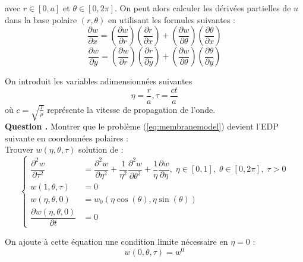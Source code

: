\documentclass[a4,12pt]{article}
\newcounter{Nbquestion}
\newcommand*\question{%
\stepcounter{Nbquestion}%
\textbf{Question \theNbquestion. }}
\begin{document}
                         avec $r \in[0,a]$ et $\theta  \in [0,2\pi]$. On peut alors calculer les dérivées partielles de $u$ dans la base polaire $(r,\theta)$ en utilisant les formules suivantes :
    \[
\dfrac{\partial w}{\partial x}=\left(\dfrac{\partial w}{\partial r}\right)\left(\dfrac{\partial r}{\partial x}\right)+\left(\dfrac{\partial w}{\partial \theta}\right)\left(\dfrac{\partial \theta}{\partial x}\right)
    \]
    \[
\dfrac{\partial w}{\partial y}=\left(\dfrac{\partial w}{\partial r}\right)\left(\dfrac{\partial r}{\partial y}\right)+\left(\dfrac{\partial w}{\partial \theta}\right)\left(\dfrac{\partial \theta}{\partial y}\right)
    \]

    On introduit les variables adimensionnées suivantes 
    \[
    \eta=\dfrac{r}{a},\tau=\dfrac{ct}{a}
    \]
    où $c=\sqrt{\frac{T}{\rho}}$ représente la vitesse de propagation  de l'onde.\\ 


    \question Montrer que le problème (\ref{eq:membranemodel}) devient l'EDP suivante en coordonnées polaires :\\

    Trouver $w(\eta,\theta,\tau)$ solution de :
    \begin{equation}
    \left\{
    \begin{array}{rl}
    \dfrac{\partial^2 w}{\partial \tau^2} & =   \dfrac{\partial^2 w}{\partial \eta^2}+\dfrac{1}
{\eta^2}\dfrac{\partial^2 w}{\partial \theta^2}+\dfrac{1}{\eta}\dfrac{\partial w}{\partial \eta},\;\eta\in[0,1],\;		\theta\in[0,2\pi],\;\tau>0\\
        w(1,\theta,\tau)& = 0  \\
        w(\eta,\theta,0)& = w_0(\eta \cos(\theta),\eta \sin (\theta)) \\
        \dfrac{\partial w(\eta,\theta,0)}{\partial t} & = 0
        \end{array}
        \right.
        \label{eq:polarmodel}
        \end{equation}

        On ajoute à cette équation une condition limite nécessaire  en $\eta=0$ :
        \[
        w(0,\theta,\tau)=w^0
        \]

\end{document}
